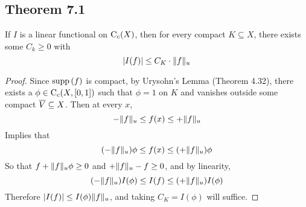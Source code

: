 \documentclass[../../main.tex]{subfiles}
\begin{document}
\subsection{Theorem 7.1}
\begin{wts}
    If $I$ is a linear functional on $\operatorname{C}_c({X})$, then for every compact $K\subseteq X$, there exists some $C_k\geq 0$ with
    \[
    |I(f)|\leq C_K\cdot \lVert {f} \rVert_u
    \]
\end{wts}
\begin{proof}
    Since $\operatorname{supp}{(f)}$ is compact, by Urysohn's Lemma (Theorem 4.32), there exists a $\phi\in\operatorname{C}_c({X,[0,1]})$ such that $\phi=1$ on $K$ and vanishes outside some compact $\overline{V}\subseteq X$. Then at every $x$,
    \[
    -\lVert {f} \rVert_u\leq f(x)\leq +\lVert {f} \rVert_u
    \]
    Implies that
    \[
    (-\lVert {f} \rVert_u)\phi \leq f(x)\leq (+\lVert {f} \rVert_u)\phi
    \]
    So that $f+\lVert {f} \rVert_u\phi\geq 0$ and $+\lVert {f} \rVert_u-f\geq 0$, and by linearity,
    \[
    (-\lVert {f} \rVert_u)I(\phi)\leq I(f)\leq (+\lVert {f} \rVert_u)I(\phi)
    \]
    Therefore $|I(f)|\leq I(\phi)\lVert {f} \rVert_u$, and taking $C_K = I(\phi)$ will suffice.
\end{proof}
\end{document}
